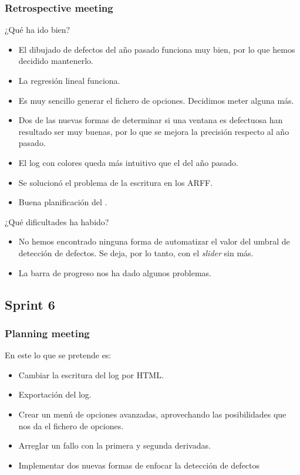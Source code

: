 \subsubsection*{Retrospective meeting}
¿Qué ha ido bien?
\begin{itemize}
 \item El dibujado de defectos del año pasado funciona muy bien, por lo que hemos decidido mantenerlo.
 \item La regresión lineal funciona.
 \item Es muy sencillo generar el fichero de opciones. Decidimos meter alguna más.
 \item Dos de las nuevas formas de determinar si una ventana es defectuosa han resultado ser muy buenas, por lo que se mejora la precisión respecto al año pasado.
 \item El log con colores queda más intuitivo que el del año pasado.
 \item Se solucionó el problema de la escritura en los ARFF.
 \item Buena planificación del \sprint{}.
\end{itemize}

¿Qué dificultades ha habido?
\begin{itemize}
 \item No hemos encontrado ninguna forma de automatizar el valor del umbral de detección de defectos. Se deja, por lo tanto, con el \emph{slider} sin más.
 \item La barra de progreso nos ha dado algunos problemas.
\end{itemize}



\subsection{Sprint 6}
\subsubsection*{Planning meeting}
En este \sprint{} lo que se pretende es:

\begin{itemize}
\item Cambiar la escritura del log por HTML.
\item Exportación del log.
\item Crear un menú de opciones avanzadas, aprovechando las posibilidades que nos da el fichero de opciones.
\item Arreglar un fallo con la primera y segunda derivadas.
\item Implementar dos nuevas formas de enfocar la detección de defectos
\end{itemize}

